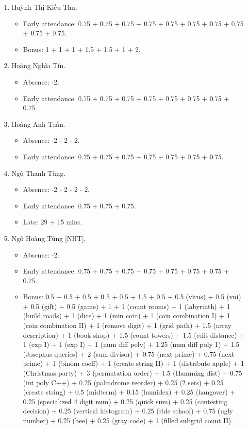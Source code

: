 \documentclass{article}
\begin{document}
\begin{enumerate}
	\begin{itemize}
		\item Absence: -1 - 1 - 2.
		\item Early attendance: 0.75 + 0.75 + 0.75 + 0.75 + 0.75.
		\item Late: 5 mins.
	\end{itemize}
	\item {\sc Huỳnh Thị Kiều Thu.}
	\begin{itemize}
		\item Early attendance: 0.75 + 0.75 + 0.75 + 0.75 + 0.75 + 0.75 + 0.75 + 0.75 + 0.75 + 0.75.
		\item Bonus: 1 + 1 + 1 + 1.5 + 1.5 + 1 + 2.
	\end{itemize}
	\item {\sc Hoàng Nghĩa Tín.}
	\begin{itemize}
        \item Absence: -2.
		\item Early attendance: 0.75 + 0.75 + 0.75 + 0.75 + 0.75 + 0.75 + 0.75 + 0.75.
	\end{itemize}
	\item {\sc Hoàng Anh Tuấn.}
	\begin{itemize}
		\item Absence: -2 - 2 - 2.
		\item Early attendance: 0.75 + 0.75 + 0.75 + 0.75 + 0.75 + 0.75 + 0.75.
	\end{itemize}
	\item {\sc Ngô Thanh Tùng.}
	\begin{itemize}
		\item Absence: -2 - 2 - 2 - 2.
		\item Early attendance: 0.75 + 0.75 + 0.75.
		\item Late: 29 + 15 mins.
	\end{itemize}
	\item {\sc Ngô Hoàng Tùng [NHT].}
	\begin{itemize}
        \item Absence: -2.
		\item Early attendance: 0.75 + 0.75 + 0.75 + 0.75 + 0.75 + 0.75 + 0.75 + 0.75.
		\item Bonus: 0.5 + 0.5 + 0.5 + 0.5 + 0.5 + 1.5 + 0.5 + 0.5 (virus) + 0.5 (vni) + 0.5 (gift) + 0.5 (game) + 1 + 1 (count rooms) + 1 (labyrinth) + 1 (build roads) + 1 (dice) + 1 (min coin) + 1 (coin combination I) + 1 (coin combination II) + 1 (remove digit) + 1 (grid path) + 1.5 (array description) + 1 (book shop) + 1.5 (count towers) + 1.5 (edit distance) + 1 (exp I) + 1 (exp I) + 1 (num diff poly) + 1.25 (num diff poly 1) + 1.5 (Josephus queries) + 2 (sum divisor) + 0.75 (next prime) + 0.75 (next prime) + 1 (binom coeff) + 1 (create string II) + 1 (distribute apple) + 1 (Christmas party) + 3 (permutation order) + 1.5 (Hamming dist) + 0.75 (int poly C++) + 0.25 (palindrome reorder) + 0.25 (2 sets) + 0.25 (create string) + 0.5 (midterm) + 0.15 (humidex) + 0.25 (hangover) + 0.25 (specialized 4 digit num) + 0.25 (quick sum)  + 0.25 (contesting decision) + 0.25 (vertical histogram) + 0.25 (ride school) + 0.75 (ugly number) + 0.25 (bee) + 0.25 (gray code) + 1 (filled subgrid count II).

\end{itemize}
\end{enumerate}
\end{document}
